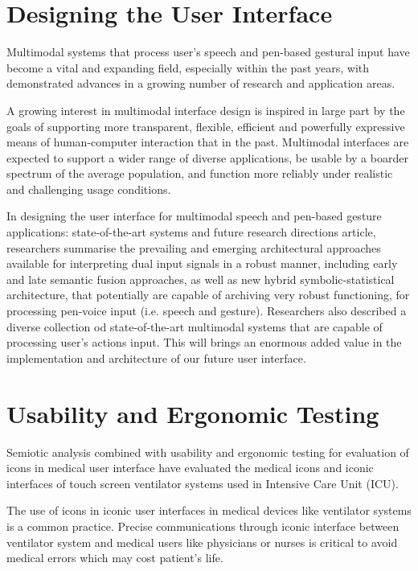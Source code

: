\section{Designing the User Interface}

Multimodal systems that process user's speech and pen-based gestural input have become a vital and expanding field, especially within the past years, with demonstrated advances in a growing number of research and application areas.

A growing interest in multimodal interface design is inspired in large part by the goals of supporting more transparent, flexible, efficient and powerfully expressive means of human-computer interaction that in the past. Multimodal interfaces are expected to support a wider range of diverse applications, be usable by a boarder spectrum of the average population, and function more reliably under realistic and challenging usage conditions.

In designing the user interface for multimodal speech and pen-based gesture applications: state-of-the-art systems and future research directions \cite{oviatt2000designing} article, researchers summarise the prevailing and emerging architectural approaches available for interpreting dual input signals in a robust manner, including early and late semantic fusion approaches, as well as new hybrid symbolic-statistical architecture, that potentially are capable of archiving very robust functioning, for processing pen-voice input (i.e. speech and gesture). Researchers also described a diverse collection od state-of-the-art multimodal systems that are capable of processing user's actions input. This will brings an enormous added value in the implementation and architecture of our future user interface.

\section{Usability and Ergonomic Testing}

Semiotic analysis combined with usability and ergonomic testing for evaluation of icons in medical user interface \cite{bhutkar2011semiotic} have evaluated the medical icons and iconic interfaces of touch screen ventilator systems used in Intensive Care Unit (ICU).

The use of icons in iconic user interfaces \cite{katre2004experimenting} in medical devices like ventilator systems is a common practice. Precise communications through iconic interface between ventilator system and medical users like physicians or nurses is critical to avoid medical errors which may cost patient's life.


